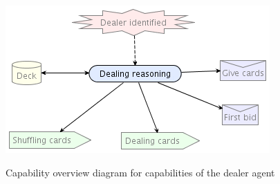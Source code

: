 \documentclass[a4paper]{article}
\begin{document}
\begin{figure}[htp]
  \centering
  \includegraphics[keepaspectratio,scale=0.45]{pdt/images/detailed_design/dealing_capability_overview_diagram.png}
  \label{fig:dealing-cap}
  \caption{Capability overview diagram for capabilities of the dealer agent}
\end{figure}
\end{document}
